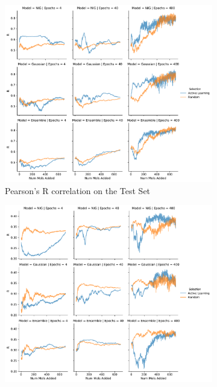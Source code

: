 \documentclass[journal=jmcmar,manuscript=article]{achemso}
\begin{document}
\begin{figure}[tbph]
    \centering
    \begin{subfigure}[b]{0.48\textwidth}
        \includegraphics[width=1\linewidth]{figures/fig6_MAT_input_R.pdf}
        \caption{Pearson's R correlation on the Test Set}
    \end{subfigure}%
    \hfill
    \begin{subfigure}[b]{0.48\textwidth}
        \includegraphics[width=1\linewidth]{figures/fig6_MAT_input_R_rest.pdf}

\end{subfigure}
\end{figure}
\end{document}
